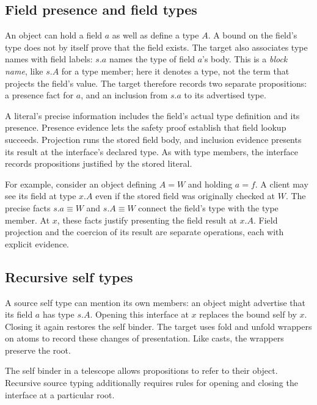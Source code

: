 \label{sec:larger}

\subsection*{Field presence and field types}
An object can hold a field $a$ as well as define a type $A$.
A bound on the field's type does not by itself prove that the field
exists. The target also associates type names with field labels:
$s.a$ names the type of field $a$'s body. This is a \emph{block name},
like $s.A$ for a type member; here it denotes a type, not the term that
projects the field's value.
The target therefore records two separate propositions:
a presence fact for $a$, and an inclusion from $s.a$ to its advertised
type.

A literal's precise information includes the field's actual type
definition and its presence. Presence evidence lets the safety proof
establish that field lookup succeeds. Projection runs the stored field
body, and inclusion evidence presents its result at the interface's
declared type.
As with type members, the interface records propositions justified by
the stored literal.

For example, consider an object defining $A=W$ and holding
$a=f$. A client may see its field at type $x.A$ even if the stored field
was originally checked at $W$. The precise facts $s.a\equiv W$ and
$s.A\equiv W$ connect the field's type with the type member.
At $x$, these facts justify presenting the field result at $x.A$.
Field projection and the coercion of its result are separate operations,
each with explicit evidence.

\subsection*{Recursive self types}
A source self type can mention its own members:
an object might advertise that its field $a$ has type $s.A$.
Opening this interface at $x$ replaces the bound self by $x$.
Closing it again restores the self binder.
The target uses fold and unfold wrappers on atoms to record these
changes of presentation. Like casts, the wrappers preserve the root.

The self binder in a telescope allows propositions to refer to their
object. Recursive source typing additionally requires rules for opening
and closing the interface at a particular root.

